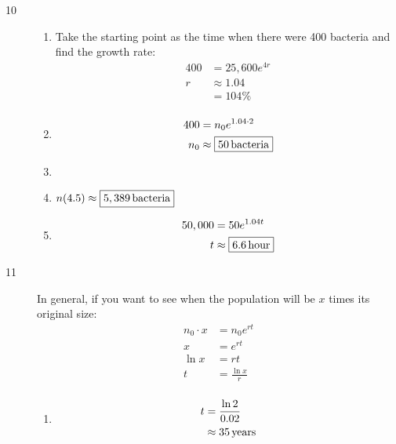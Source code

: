\documentclass{exam}
\begin{document}
\begin{description}
\begin{enumerate}[a]
        \end{enumerate}

      \item[10] 
        \begin{enumerate}[a]
          \item Take the starting point as the time when there were 400 bacteria and find the growth rate:
            \begin{align*}
              400 & = 25,600 e^{4r} \\
              r   & \approx 1.04 \\
                  & = \boxed{104\%} \\
            \end{align*}

          \item 
            \begin{align*}
              400 & = n_0 e^{1.04 \cdot 2} \\
              n_0 & \approx \boxed{\unit[50]{bacteria}} \\
            \end{align*}

          \item {}

          \item $n(4.5) \approx \boxed{\unit[5,389]{bacteria}}$

          \item 
            \begin{align*}
              50,000 & = 50 e^{1.04 t} \\
              t      & \approx \boxed{\unit[6.6]{hour}} \\
            \end{align*}
        \end{enumerate}

      \item[11] 
        In general, if you want to see when the population will be $x$ times its original size:
        \begin{align*}
          n_0 \cdot x & = n_0 e^{rt} \\
          x           & =  e^{rt} \\
          \ln x       & = rt \\
          t           & = \frac{\ln x}{r} \\
        \end{align*}

        \begin{enumerate}[a]
          \item 
            \begin{align*}
              t & = \frac{\ln 2}{0.02} \\
                & \approx \unit[35]{years} \\
            \end{align*}


\end{enumerate}
\end{description}
\end{document}
